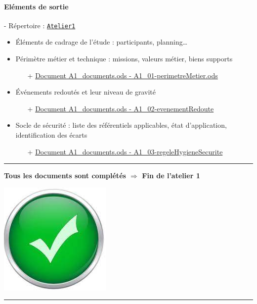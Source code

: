 \documentclass[french, 12pt]{article}%
\newcommand{\itemE}{\item[$\bullet$]}
\begin{document}
\paragraph{Eléments de sortie} - Répertoire : \href{run:./ressource_eleve/Atelier1/}{\verb?Atelier1?}
\begin{itemize}
    \itemE Éléments de cadrage de l’étude : participants, planning…
	\itemE Périmètre métier et technique : missions, valeurs métier, biens supports
		\begin{itemize}
		\item[+] \href{run:./ressource_eleve/Atelier1/A1_documents.ods}{Document A1\_documents.ods - A1\_01-perimetreMetier.ods}	
		\end{itemize}
	\itemE Événements redoutés et leur niveau de gravité 
		\begin{itemize}
		\item[+] \href{run:./ressource_eleve/Atelier1/A1_documents.ods}{Document A1\_documents.ods - A1\_02-evenementRedoute}	
		\end{itemize}
	\itemE Socle de sécurité : liste des référentiels applicables, état d’application, identification des écarts
		\begin{itemize}
		\item[+] \href{run:./ressource_eleve/Atelier1/A1_documents.ods}{Document A1\_documents.ods - A1\_03-regeleHygieneSecurite}	
		\end{itemize}
\end{itemize}
\vspace{0.5cm}
\begin{center}
 \rule{0.75\linewidth}{1pt}
\end{center}
\begin{minipage}[c]{0.59\linewidth}

\textbf{Tous les documents sont complétés $\Rightarrow$ Fin de l'atelier 1}
\end{minipage}
\begin{minipage}[c]{0.4\linewidth}
\begin{center}
\includegraphics[scale=0.1]{./ressource/OKLogo}
\end{center}
\end{minipage}
\begin{center}
 \rule{0.75\linewidth}{1pt}
\end{center}
\end{document}
